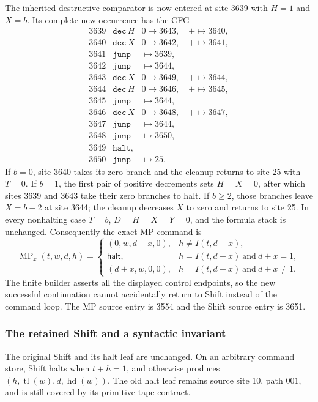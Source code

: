 The inherited destructive comparator is now entered at site 3639 with
$H=1$ and $X=b$. Its complete new occurrence has the CFG
\[
\begin{array}{rll}
3639&\mathtt{dec}\,H&0\mapsto3643,\quad +\mapsto3640,\\
3640&\mathtt{dec}\,X&0\mapsto3642,\quad +\mapsto3641,\\
3641&\mathtt{jump}&\mapsto3639,\\
3642&\mathtt{jump}&\mapsto3644,\\
3643&\mathtt{dec}\,X&0\mapsto3649,\quad +\mapsto3644,\\
3644&\mathtt{dec}\,H&0\mapsto3646,\quad +\mapsto3645,\\
3645&\mathtt{jump}&\mapsto3644,\\
3646&\mathtt{dec}\,X&0\mapsto3648,\quad +\mapsto3647,\\
3647&\mathtt{jump}&\mapsto3644,\\
3648&\mathtt{jump}&\mapsto3650,\\
3649&\mathtt{halt},&\\
3650&\mathtt{jump}&\mapsto25.
\end{array}
\]
If $b=0$, site 3640 takes its zero branch and the cleanup returns to
site 25 with $T=0$. If $b=1$, the first pair of positive decrements
sets $H=X=0$, after which sites 3639 and 3643 take their zero branches
to halt. If $b\ge2$, those branches leave $X=b-2$ at site 3644; the
cleanup decreases $X$ to zero and returns to site 25. In every
nonhalting case $T=b$, $D=H=X=Y=0$, and the formula stack is unchanged.
Consequently the exact MP command is
\[
 \operatorname{MP}_x(t,w,d,h)=
 \begin{cases}
  (0,w,d+x,0),&h\ne I(t,d+x),\\
  \mathsf{halt},&h=I(t,d+x)\ \text{and}\ d+x=1,\\
  (d+x,w,0,0),&h=I(t,d+x)\ \text{and}\ d+x\ne1.
 \end{cases}
\]
The finite builder asserts all the displayed control endpoints, so the
new successful continuation cannot accidentally return to Shift instead
of the command loop. The MP source entry is 3554 and the Shift source
entry is 3651.

\subsubsection{The retained Shift and a syntactic invariant}

The original Shift and its halt leaf are unchanged. On an arbitrary
command store, Shift halts when $t+h=1$, and otherwise produces
$(h,\operatorname{tl}(w),d,\operatorname{hd}(w))$.
The old halt leaf remains source site 10, path $001$, and is still
covered by its primitive tape contract.

